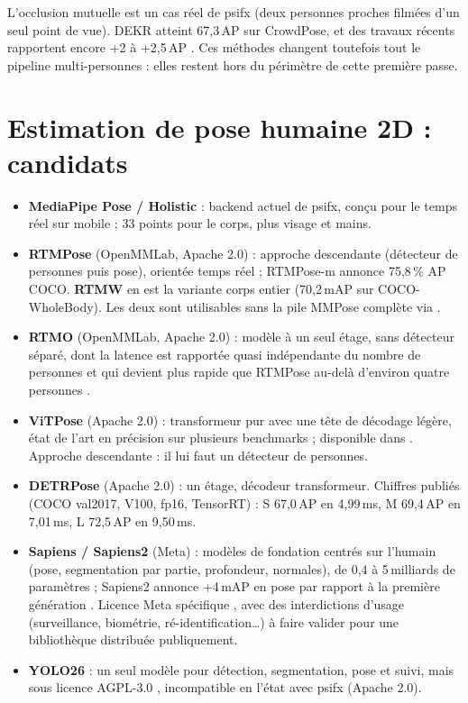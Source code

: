 \documentclass[11pt,a4paper]{report}
\newcommand{\code}[1]{\texttt{\detokenize{#1}}}
\begin{document}
L'occlusion mutuelle est un cas réel de psifx (deux personnes proches filmées d'un seul point de vue). DEKR
\cite{geng2021dekr} atteint 67,3\,AP sur CrowdPose, et des travaux récents rapportent encore +2 à +2,5\,AP
\cite{featureselection2026realtime}. Ces méthodes changent toutefois tout le pipeline multi-personnes : elles
restent hors du périmètre de cette première passe.

\section{Estimation de pose humaine 2D : candidats}
\label{sec:sota-pose}

\begin{itemize}
    \item \textbf{MediaPipe Pose / Holistic} \cite{lugaresi2019mediapipe,forasoft2026posestack} : backend actuel de psifx, conçu pour le
    temps réel sur mobile ; 33 points pour le corps, plus visage et mains.
    \item \textbf{RTMPose} \cite{jiang2023rtmpose} (OpenMMLab, Apache 2.0) : approche descendante (détecteur de
    personnes puis pose), orientée temps réel ; RTMPose-m annonce 75,8\,\% AP COCO. \textbf{RTMW}
    \cite{jiang2024rtmw} en est la variante corps entier (70,2\,mAP sur COCO-WholeBody). Les deux sont utilisables
    sans la pile MMPose complète via \code{rtmlib} \cite{rtmlib}.
    \item \textbf{RTMO} \cite{lu2024rtmo} (OpenMMLab, Apache 2.0) : modèle à un seul étage, sans détecteur séparé,
    dont la latence est rapportée quasi indépendante du nombre de personnes et qui devient plus rapide que RTMPose
    au-delà d'environ quatre personnes \cite{mmpose_discussion3135}.
    \item \textbf{ViTPose} \cite{xu2022vitpose} (Apache 2.0) : transformeur pur avec une tête de décodage légère,
    état de l'art en précision sur plusieurs benchmarks ; disponible dans \code{transformers} \cite{hf_vitpose}.
    Approche descendante : il lui faut un détecteur de personnes.
    \item \textbf{DETRPose} \cite{janampa2025detrpose,detrpose_repo} (Apache 2.0) : un étage, décodeur transformeur.
    Chiffres publiés (COCO val2017, V100, fp16, TensorRT) : S 67,0\,AP en 4,99\,ms, M 69,4\,AP en 7,01\,ms,
    L 72,5\,AP en 9,50\,ms.
    \item \textbf{Sapiens / Sapiens2} \cite{khirodkar2024sapiens,sapiens2_hf} (Meta) : modèles de fondation centrés
    sur l'humain (pose, segmentation par partie, profondeur, normales), de 0,4 à 5\,milliards de paramètres ;
    Sapiens2 annonce +4\,mAP en pose par rapport à la première génération \cite{sapiens2_marktechpost}. Licence
    Meta spécifique \cite{sapiens2_license}, avec des interdictions d'usage (surveillance, biométrie,
    ré-identification\ldots) à faire valider pour une bibliothèque distribuée publiquement.
    \item \textbf{YOLO26} \cite{ultralytics2026yolo26} : un seul modèle pour détection, segmentation, pose et suivi,
    mais sous licence AGPL-3.0 \cite{ultralytics_license}, incompatible en l'état avec psifx (Apache 2.0).
\end{itemize}
\end{document}
